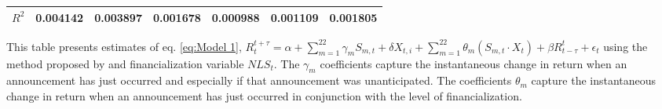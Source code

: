 \begin{sidewaystable}
{\begin{tabular}{@{}lllllllllllll@{}}
                                         \\ \textbf{$R^2$}             &\multicolumn{2}{c}{ 0.004142 }                                                 & \multicolumn{2}{c}{ 0.003897 }                                                 & \multicolumn{2}{c}{ 0.001678 }                                                 & \multicolumn{2}{c}{ 0.000988 }                                                 & \multicolumn{2}{c}{ 0.001109 }                                                   & \multicolumn{2}{c}{ 0.001805 }                                                 \\ \bottomrule 
\end{tabular}
}
\begin{tablenotes}\item 
    \singlespacing
    \footnotesize
    This table presents estimates of eq. \ref{eq:Model 1}, $R_{t}^{t+\tau}=\alpha+\sum_{m=1}^{22} \gamma_m S_{m,t}+ \delta X_{t,i} + \sum_{m=1}^{22} \theta_m (S_{m,t} \cdot X_t)+\beta R_{t-\tau}^{t}+\epsilon_{t}$ using the method proposed by \citet{kurov2019price} and financialization variable $NLS_t$. The $\gamma_m$ coefficients capture the instantaneous change in return when an announcement has just occurred and especially if that announcement was unanticipated. The coefficients $\theta_m$ capture the instantaneous change in return when an announcement has just occurred in conjunction with the level of financialization.
\end{tablenotes}
\end{sidewaystable}


